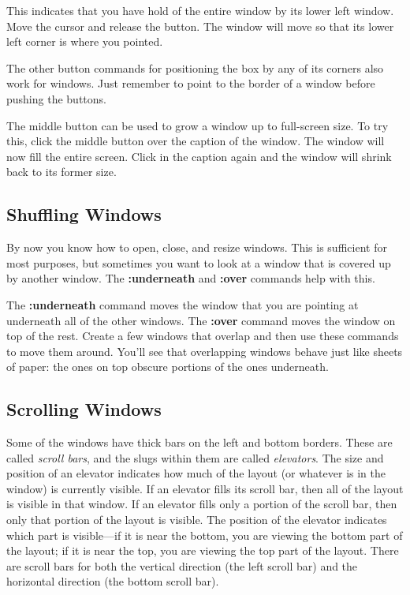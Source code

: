 \documentclass[letterpaper,twoside,12pt]{article}
\begin{document}
This indicates that you have hold of the entire window by its lower left
window.  Move the cursor and release the button.  The window will move so that
its lower left corner is where you pointed.

The other button commands for positioning the box by any of its corners
also work for windows.  Just remember to point to the border of a window
before pushing the buttons.

The middle button can be used to grow a window up to full-screen size.
To try this, click the middle button over the caption of the window.
The window will now fill the entire screen.  Click in the caption again
and the window will shrink back to its former size.

\subsection{Shuffling Windows}

By now you know how to open, close, and resize windows.  This is sufficient
for most purposes, but sometimes you want to look at a window that is covered
up by another window.  The {\bfseries :underneath} and {\bfseries :over} commands help
with this.

The {\bfseries :underneath} command moves the window that you are pointing at 
underneath all of the other windows.  The {\bfseries :over} command moves the
window on top of the rest.  Create a few windows that overlap and then
use these commands to move them around.  You'll see that overlapping windows
behave just like sheets of paper:  the ones on top obscure portions of
the ones underneath.

\subsection{Scrolling Windows}

Some of the windows have thick bars on the left and bottom borders.
These are called {\itshape scroll bars}, and the slugs within them
are called {\itshape elevators}.  The size and position of an elevator
indicates how much of the layout (or whatever is in the window)
is currently visible.
If an elevator fills its scroll bar, then all of the layout is visible
in that window.  If an elevator fills only a portion of the scroll bar, 
then only that portion of the layout is visible.  The position of the elevator
indicates which part is visible---if it is near the bottom, 
you are viewing the bottom part of the layout; 
if it is near the top, you are viewing the top part of the layout.
There are scroll bars for both the vertical direction (the left scroll bar)
and the horizontal direction (the bottom scroll bar).
\end{document}
